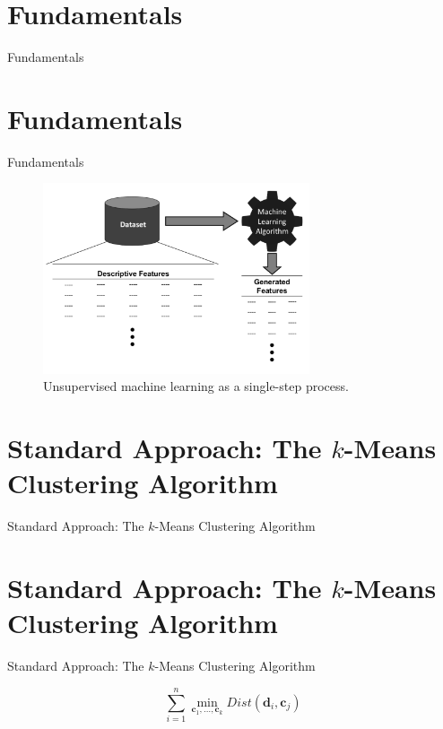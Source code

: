 \documentclass[xcolor={table}]{beamer}
\newcommand{\SectionSlide}[2][]{
	\ifthenelse{\isempty{#1}}
		{\section{#2}\begin{frame} \begin{center}\begin{huge}#2\end{huge}\end{center}\end{frame}}
		{\section[#1]{#2}\begin{frame} \begin{center}\begin{huge}#2\end{huge}\end{center}\end{frame}}
}
\begin{document}
\SectionSlide{Fundamentals}



 \begin{frame} 
\begin{figure}[htb]
       \begin{centering}
       \includegraphics[width=0.7\textwidth]{images/fmlpda_figure_10_2.pdf}
       \caption{Unsupervised machine learning as a single-step process.}
       \label{fig:unsupervisedlearning}
       \end{centering}
\end{figure}
\end{frame} 


\SectionSlide{Standard Approach: The $k$-Means Clustering Algorithm}



 \begin{frame} 
\begin{equation}
\sum_{i=1}^n \min_{{\mathbf{c}_1},\ldots, {\mathbf{c}_k}} {Dist}(\mathbf{d}_i, {\mathbf{c}_j})
\end{equation}
\end{frame} 
\end{document}
